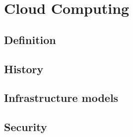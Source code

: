 \chapter{Cloud Computing}
\section{Definition}
\section{History}
\section{Infrastructure models}
\section{Security}


